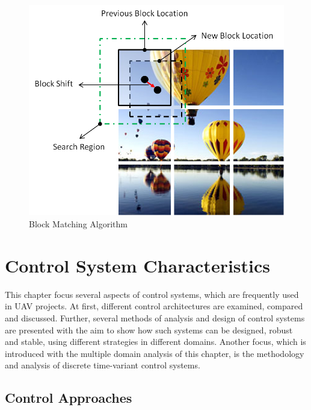 \begin{figure}[!h]
	\centering
		\includegraphics[width=1\textwidth]{graphic/BlockMatching.png}
\caption{Block Matching Algorithm}
	\label{fig:BlockMatching.png}
\end{figure}





\section{Control System Characteristics}
\label{mt:c:literature:s:Control_Systems_Characteristics}

This chapter focus several aspects of control systems, which are frequently used in \gls{UAV} projects. At first, different control architectures are examined, compared and discussed.
Further, several methods of analysis and design of control systems are presented with the aim to show how such systems can be 
designed, robust and stable, using different strategies in different domains. Another focus, which is introduced with the multiple domain analysis of this chapter, is the methodology and analysis of discrete time-variant control systems.

\subsection{Control Approaches} %

